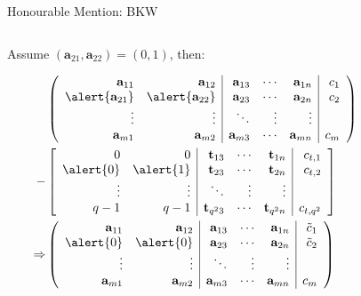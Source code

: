 \documentclass[presentation,smaller]{beamer}
\renewcommand{\vec}[1]{\mathbf{#1}\xspace}
\begin{document}
\begin{frame}[label={sec:org3c0899c}]{Honourable Mention: BKW}
\begin{columns}
\begin{column}{0.6\columnwidth}
Assume \((\vec{a}_{21},\vec{a}_{22}) = (0, 1)\), then:

\footnotesize
\begin{align*}
  & \left(
    \begin{array}{rr|rrr|r}
      \phantom{xn}\vec{a}_{11}         & \phantom{xn}\vec{a}_{12}         & \vec{a}_{13} & \cdots & \vec{a}_{1n} & c_1\\
      \alert{\vec{a}_{21}} & \alert{\vec{a}_{22}} & \vec{a}_{23} & \cdots & \vec{a}_{2n} & c_2\\
      \vdots               & \vdots               & \ddots       & \vdots & \vdots\\
      \vec{a}_{m1}         & \vec{a}_{m2}         & \vec{a}_{m3} & \cdots & \vec{a}_{mn} & c_{m}
    \end{array}\right)\\
  -& \left[
     \begin{array}{rr|rrr|r}
       0         & 0         & \vec{t}_{13}   & \cdots & \vec{t}_{1n}   & c_{t,1}\\
       \alert{0} & \alert{1} & \vec{t}_{23}   & \cdots & \vec{t}_{2n}   & c_{t,2}\\
       \vdots    & \vdots    & \ddots         & \vdots & \vdots\\
       q-1       & q-1       & \vec{t}_{q^23} & \cdots & \vec{t}_{q^2n} & c_{t,q^2}
     \end{array}\right]\\
  \Rightarrow &
                \left(\begin{array}{rr|rrr|r}
                        \phantom{xn}\vec{a}_{11} & \phantom{xn}\vec{a}_{12} & \vec{a}_{13}      & \cdots & \vec{a}_{1n}      & \tilde{c}_1\\
                        \alert{0}    & \alert{0}    & \vec{a}_{23} & \cdots & \vec{a}_{2n} & \tilde{c}_2\\
                        \vdots       & \vdots       & \ddots            & \vdots & \vdots\\
                        \vec{a}_{m1} & \vec{a}_{m2} & \vec{a}_{m3}      & \cdots & \vec{a}_{mn}      & c_{m}
                      \end{array}\right)
\end{align*}
\end{column}

\begin{column}{0.4\columnwidth}
\scriptsize



\end{column}
\end{columns}
\end{frame}
\end{document}
